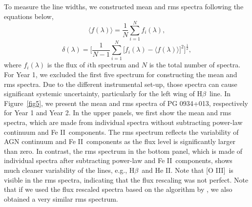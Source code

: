\documentclass[iop]{emulateapj}
\newcommand{\Hb}{\rm H{$\beta$}}
\newcommand{\OIII}{[O {\small III}]}
\newcommand{\FeII}{Fe {\small II}}
\newcommand{\HeII}{He {\small II}}
\begin{document}
To measure the line widths, we constructed mean and rms spectra following the equations below, 
\begin{equation}\label{eq:mean_spec}
{\langle f(\lambda) \rangle} = \frac{1}{N}\sum_{i=1}^{N}f_{i}(\lambda), 
\end{equation}
\begin{equation}\label{eq:rms_spec}
\delta(\lambda)  = \Bigg[ \frac{1}{N-1}\sum_{i=1}^{N} \big[f_{i}(\lambda)-{\langle f(\lambda) \rangle} \big]^{2} \Bigg]^{\frac{1}{2}},
\end{equation}
where $f_{i}(\lambda)$ is the flux of $i$th spectrum and $N$ is the total number of spectra. For Year 1, we excluded the first five spectrum for constructing the mean and rms spectra. Due to the different instrumental set-up, those spectra can cause significant systemic uncertainty, particularly for the left wing of \Hb\ line.
In Figure~\ref{fig5}, we present the mean and rms spectra of PG 0934+013, respectively for Year 1 and Year 2. In the upper panels, we first show the mean and rms spectra, which are made from individual spectra without subtracting power-law continuum and \FeII\ components. The rms spectrum reflects the variability of AGN continuum and \FeII\ components as the flux level is significantly larger than zero. In contrast, the rms spectrum in the bottom panel, which is made of individual spectra after subtracting power-law 
and \FeII\ components, shows much cleaner variability of the lines, e.g., \Hb\ and \HeII. Note that \OIII\ is visible in the rms spectra, indicating that the flux rescaling was not perfect. 
Note that if we used the flux rescaled spectra based on the algorithm by \citet{Fausnaugh2016}, we also obtained a very similar rms spectrum. 
\end{document}
